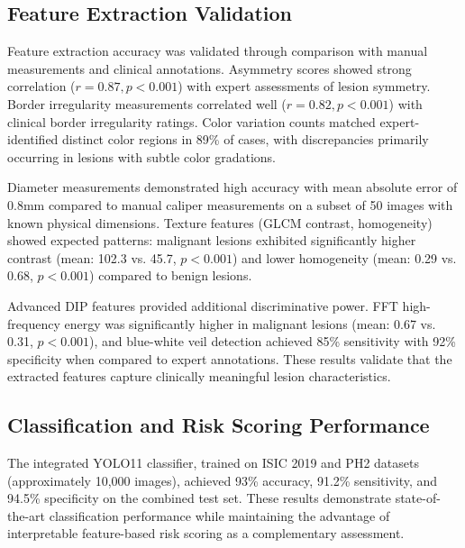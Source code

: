 \documentclass[conference]{IEEEtran}
\begin{document}
\subsection{Feature Extraction Validation}

Feature extraction accuracy was validated through comparison with manual measurements and clinical annotations. Asymmetry scores showed strong correlation ($r = 0.87, p < 0.001$) with expert assessments of lesion symmetry. Border irregularity measurements correlated well ($r = 0.82, p < 0.001$) with clinical border irregularity ratings. Color variation counts matched expert-identified distinct color regions in 89\% of cases, with discrepancies primarily occurring in lesions with subtle color gradations.

Diameter measurements demonstrated high accuracy with mean absolute error of 0.8mm compared to manual caliper measurements on a subset of 50 images with known physical dimensions. Texture features (GLCM contrast, homogeneity) showed expected patterns: malignant lesions exhibited significantly higher contrast (mean: 102.3 vs. 45.7, $p < 0.001$) and lower homogeneity (mean: 0.29 vs. 0.68, $p < 0.001$) compared to benign lesions.

Advanced DIP features provided additional discriminative power. FFT high-frequency energy was significantly higher in malignant lesions (mean: 0.67 vs. 0.31, $p < 0.001$), and blue-white veil detection achieved 85\% sensitivity with 92\% specificity when compared to expert annotations. These results validate that the extracted features capture clinically meaningful lesion characteristics.

\subsection{Classification and Risk Scoring Performance}

The integrated YOLO11 classifier, trained on ISIC 2019 and PH2 datasets (approximately 10,000 images), achieved 93\% accuracy, 91.2\% sensitivity, and 94.5\% specificity on the combined test set. These results demonstrate state-of-the-art classification performance while maintaining the advantage of interpretable feature-based risk scoring as a complementary assessment.
\end{document}
